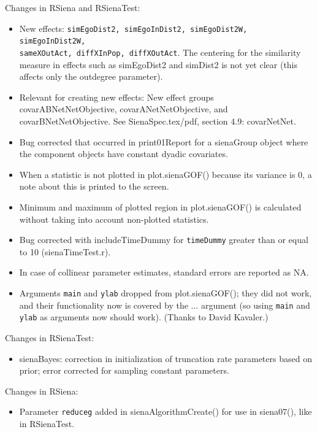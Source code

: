 \documentclass[a4paper,fleqn,11pt]{article}
\newcommand{\+}{\, + \,}
\newcommand{\sfn}[1]{\textsf{#1}}
\begin{document}
\begin{small}
\begin{itemize}
Changes in RSiena and RSienaTest:
\begin{itemize}
   \item New effects: \texttt{simEgoDist2, simEgoInDist2, simEgoDist2W, simEgoInDist2W,\\
         sameXOutAct, diffXInPop, diffXOutAct}. The centering for the similarity
         measure in effects such as simEgoDist2 and simDist2 is not yet clear
         (this affects only the outdegree parameter).
   \item  Relevant for creating new effects:
        New effect groups  \sfn{covarABNetNetObjective},
         \sfn{covarANetNetObjective}, and \sfn{covarBNetNetObjective}.
    	See \sfn{SienaSpec.tex/pdf}, section 4.9: \sfn{covarNetNet}.
   \item Bug corrected that occurred in \sfn{print01Report} for a \sfn{sienaGroup} object
     where the component objects have constant dyadic covariates.
   \item When a statistic is not plotted in \sfn{plot.sienaGOF()} because
     its variance is 0, a note about this is printed to the screen.
   \item Minimum and maximum of plotted region in \sfn{plot.sienaGOF()}
     is calculated without taking into account non-plotted statistics.
   \item Bug corrected with includeTimeDummy for \texttt{timeDummy} greater than
     or equal to 10 (\sfn{sienaTimeTest.r}).
   \item In case of collinear parameter estimates, standard errors
     are reported as NA.
   \item Arguments \texttt{main} and \texttt{ylab} dropped from
     \sfn{plot.sienaGOF()}; they did
     not work, and their functionality now is covered by the ...
     argument (so using \texttt{main} and \texttt{ylab} as arguments now should work).
     (Thanks to David Kavaler.)
\end{itemize}
Changes in RSienaTest:
\begin{itemize}
   \item \sfn{sienaBayes}: correction in initialization of truncation rate parameters
     based on prior; error corrected for sampling constant parameters.
\end{itemize}
Changes in RSiena:
\begin{itemize}
   \item Parameter \texttt{reduceg} added in \textsf{sienaAlgorithmCreate()}
   for use in \textsf{siena07()}, like in RSienaTest.
\end{itemize}



\end{itemize}
\end{small}
\end{document}
